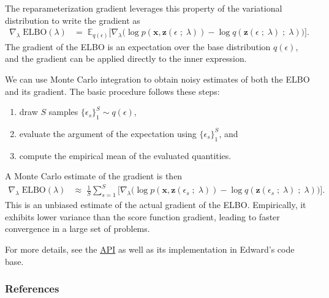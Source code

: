 The reparameterization gradient leverages this property of the
variational distribution to write the gradient as
\begin{align*}
  \nabla_\lambda\;
  \text{ELBO}(\lambda)
  &=\;
  \mathbb{E}_{q(\epsilon)}
  \big[
  \nabla_\lambda
  \big(
  \log p(\mathbf{x}, \mathbf{z}(\epsilon \;;\; \lambda))
  -
  \log q(\mathbf{z}(\epsilon \;;\; \lambda) \;;\;\lambda)
  \big)
  \big].
\end{align*}
The gradient of the ELBO is an expectation over the base
distribution $q(\epsilon)$, and the gradient can be applied directly
to the inner expression.

We can use Monte Carlo integration to obtain noisy estimates of both the ELBO
and its gradient. The basic procedure follows these steps:
\begin{enumerate}
  \item draw $S$ samples $\{\epsilon_s\}_1^S \sim q(\epsilon)$,
  \item evaluate the argument of the expectation using $\{\epsilon_s\}_1^S$, and
  \item compute the empirical mean of the evaluated quantities.
\end{enumerate}

A Monte Carlo estimate of the gradient is then
\begin{align*}
  \nabla_\lambda\;
  \text{ELBO}(\lambda)
  &\approx\;
  \frac{1}{S}
  \sum_{s=1}^{S}
  \big[
  \nabla_\lambda
  \big(
  \log p(\mathbf{x}, \mathbf{z}(\epsilon_s \;;\; \lambda))
  -
  \log q(\mathbf{z}(\epsilon_s \;;\; \lambda) \;;\;\lambda)
  \big)
  \big].
\end{align*}
This is an unbiased estimate of the actual gradient of the ELBO. Empirically, it
exhibits lower variance than the
score function gradient, leading to
faster convergence in a large set of problems.

For more details, see the \href{/api/}{API} as well as its
implementation in Edward's code base.

\subsubsection{References}\label{references}
